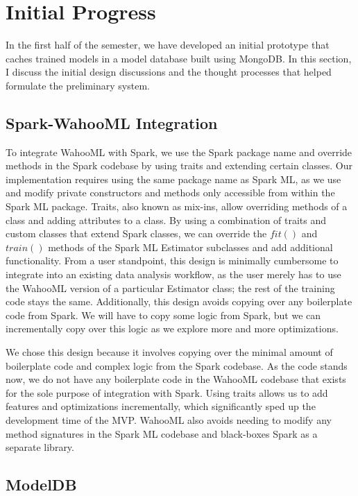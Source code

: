 \documentclass[../proposal.tex]{subfiles}
\begin{document}
\section{Initial Progress}

In the first half of the semester, we have developed an initial prototype that
caches trained models in a model database built using MongoDB. In this section,
I discuss the initial design discussions and the thought processes that helped
formulate the preliminary system.

\subsection{Spark-WahooML Integration}

To integrate WahooML with Spark, we use the Spark package name and override
methods in the Spark codebase by using traits and extending certain classes.
Our implementation requires using the same package name as Spark ML, as we use
and modify private constructors and methods only accessible from within the
Spark ML package. Traits, also known as mix-ins, allow overriding methods of a
class and adding attributes to a class. By using a combination of traits and
custom classes that extend Spark classes, we can override the $fit()$ and
$train()$ methods of the Spark ML Estimator subclasses and add additional
functionality.  From a user standpoint, this design is minimally cumbersome to
integrate into an existing data analysis workflow, as the user merely has to
use the WahooML version of a particular Estimator class; the rest of the
training code stays the same. Additionally, this design avoids copying over any
boilerplate code from Spark. We will have to copy some logic from Spark, but we
can incrementally copy over this logic as we explore more and more
optimizations.

We chose this design because it involves copying over the minimal amount of
boilerplate code and complex logic from the Spark codebase. As the code stands
now, we do not have any boilerplate code in the WahooML codebase that exists
for the sole purpose of integration with Spark. Using traits allows us to add
features and optimizations incrementally, which significantly sped up the
development time of the MVP. WahooML also avoids needing to modify any method
signatures in the Spark ML codebase and black-boxes Spark as a separate library.

\subsection{ModelDB}
\end{document}

